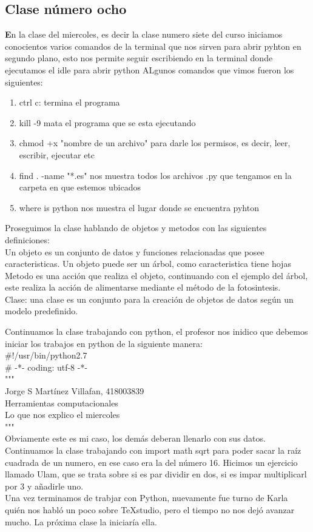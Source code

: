 \documentclass{book}
\begin{document}
\begin{enumerate}
\begin{enumerate}
\chapter{Clase número ocho}
\textbf En la clase del miercoles, es decir la clase numero siete del curso iniciamos conocientos varios comandos de la terminal que nos sirven para abrir pyhton en segundo plano, esto nos permite seguir escribiendo en la terminal donde ejecutamos el idle para abrir python
ALgunos comandos que vimos fueron los siguientes:
\begin{enumerate}
	\item ctrl c: termina el programa
	\item kill -9 mata el programa que se esta ejecutando
	\item chmod +x "nombre de un archivo" para darle los permisos, es decir, leer, escribir, ejecutar etc
	\item find . -name "*.es" nos muestra todos los archivos .py que tengamos en la carpeta en que estemos ubicados
	\item where is python nos muestra el lugar donde se encuentra pyhton
\end{enumerate}
Proseguimos la clase hablando de objetos y metodos con las siguientes definiciones:\\
Un objeto es un conjunto de datos y funciones relacionadas que posee caracteristicas. Un objeto puede ser un árbol, como caracteristica tiene hojas\\
Metodo es una acción que realiza el objeto, continuando con el ejemplo del árbol, este realiza la acción de alimentarse mediante el método de la fotosintesis. \\
Clase: una clase es un conjunto para la creación de objetos de datos según un modelo predefinido.

Continuamos la clase trabajando con python, el profesor nos inidico que debemos iniciar los trabajos en python de la siguiente manera:\\

\#!/usr/bin/python2.7\\
\# -*- coding: utf-8 -*-\\
"""\\
Jorge S Martínez Villafan, 418003839\\
Herramientas computacionales\\
Lo que nos explico el miercoles\\
"""\\
Obviamente este es mi caso, los demás deberan llenarlo con sus datos.
Continuamos la clase trabajando con import math sqrt para poder sacar la raíz cuadrada de un numero, en ese caso era la del número 16. Hicimos un ejercicio llamado Ulam, que se trata sobre si es par dividir en dos, si es impar multiplicarl por 3 y añadirle uno. \\
Una vez terminamos de trabjar con Python, nuevamente fue turno de Karla quién nos habló un poco sobre TeXstudio, pero el tiempo no nos dejó avanzar mucho. La próxima clase la iniciaría ella.


\end{enumerate}
\end{enumerate}
\end{document}

